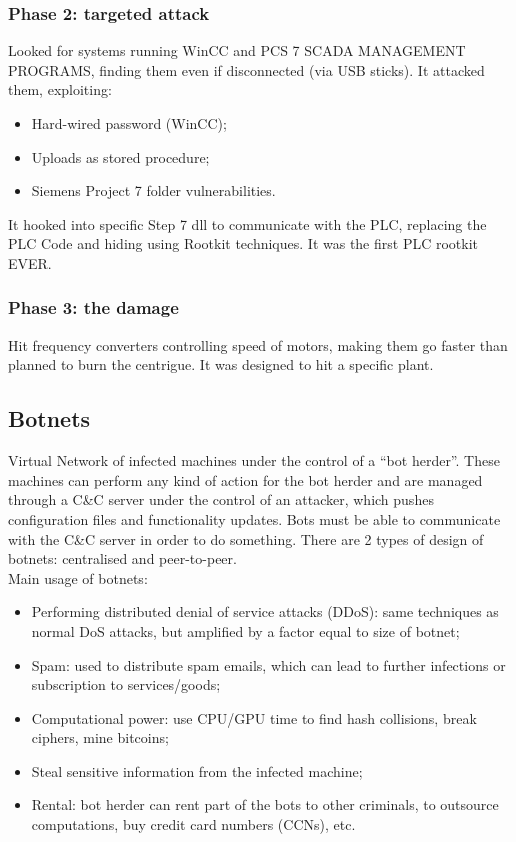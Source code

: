 \documentclass[a4paper, 10pt, titlepage]{article}
\begin{document}
\subsubsection*{Phase 2: targeted attack}
Looked for systems running WinCC and PCS 7 SCADA MANAGEMENT PROGRAMS, finding them even if disconnected (via USB sticks). It attacked them, exploiting:
\begin{itemize}
	\item Hard-wired password (WinCC);
	\item Uploads as stored procedure;
	\item Siemens Project 7 folder vulnerabilities.
\end{itemize}
It hooked into specific Step 7 dll to communicate with the PLC, replacing the PLC Code and hiding using Rootkit techniques. It was the first PLC rootkit EVER.

\subsubsection*{Phase 3: the damage}
Hit frequency converters controlling speed of motors, making them go faster than planned to burn the centrigue. It was designed to hit a specific plant.

\subsection{Botnets}
Virtual Network of infected machines under the control of a “bot herder”. These machines can perform any kind of action for the bot herder and are managed through a C\&C server under the control of an attacker, which pushes configuration files and functionality updates. Bots must be able to communicate with the C\&C server in order to do something. There are 2 types of design of botnets: centralised and peer-to-peer. \medskip\\
Main usage of botnets:
\begin{itemize}
	\item Performing distributed denial of service attacks (DDoS): same techniques as normal DoS attacks, but amplified by a factor equal to size of botnet;
	\item Spam: used to distribute spam emails, which can lead to further infections or subscription to services/goods;
	\item Computational power: use CPU/GPU time to find hash collisions, break ciphers, mine bitcoins;
	\item Steal sensitive information from the infected machine;
	\item Rental: bot herder can rent part of the bots to other 	criminals, to outsource computations, buy credit card numbers (CCNs), etc.
\end{itemize}
\end{document}
